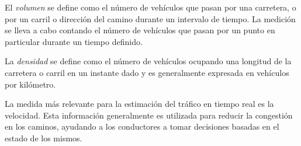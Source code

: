 El \emph{volumen} se define como el número de vehículos que pasan por una carretera, o por un carril o dirección del camino durante un intervalo de tiempo. La medición se lleva a cabo contando el número de vehículos que pasan por un punto en particular durante un tiempo definido.

La \emph{densidad} se define como el número de vehículos ocupando una longitud de la carretera o carril en un instante dado y es generalmente expresada en vehículos por kilómetro.

La medida más relevante para la estimación del tráfico en tiempo real es la velocidad. Esta información generalmente es utilizada para reducir la congestión en los caminos, ayudando a los conductores a tomar decisiones basadas en el estado de los mismos.